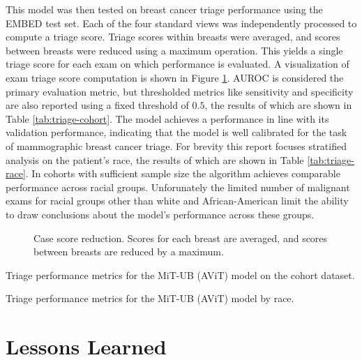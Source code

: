\documentclass[12pt]{article}
\begin{document}
This model was then tested on breast cancer triage performance using the EMBED test set. Each of the four standard views was independently processed to compute a triage score. Triage scores within breasts were averaged, and scores between breasts were reduced using a maximum operation. This yields a single triage score for each exam on which performance is evaluated.
A visualization of exam triage score computation is shown in Figure \ref{fig:case-score}.
AUROC is considered the primary evaluation metric, but thresholded metrics like sensitivity and specificity are also reported using a fixed threshold of $0.5$, the results of which are shown in Table \ref{tab:triage-cohort}. The model achieves a performance in line with its validation performance, indicating that the model is well calibrated for the task of mammographic breast cancer triage.
For brevity this report focuses stratified analysis on the patient's race, the results of which are shown in Table \ref{tab:triage-race}. In cohorts with sufficient sample size the algorithm achieves comparable performance across racial groups. Unforunately the limited number of malignant exams for racial groups other than white and African-American limit the ability to draw conclusions about the model's performance across these groups.


\begin{figure}[H]
    \centering
    
    \caption{Case score reduction. Scores for each breast are averaged, and scores between breasts are reduced by a maximum.}
    \label{fig:case-score}
\end{figure}

\begin{table}[H]
    \centering
    
    \caption{Triage performance metrics for the MiT-UB (AViT) model on the cohort dataset.}
    \label{tab:triage-cohort}
\end{table}


\begin{table}[H]
    \centering
    \resizebox{\textwidth}{!}{%
        
    }
    \caption{Triage performance metrics for the MiT-UB (AViT) model by race.}
    \label{tab:triage-race}
\end{table}


\section{Lessons Learned}
\noindent
\end{document}
